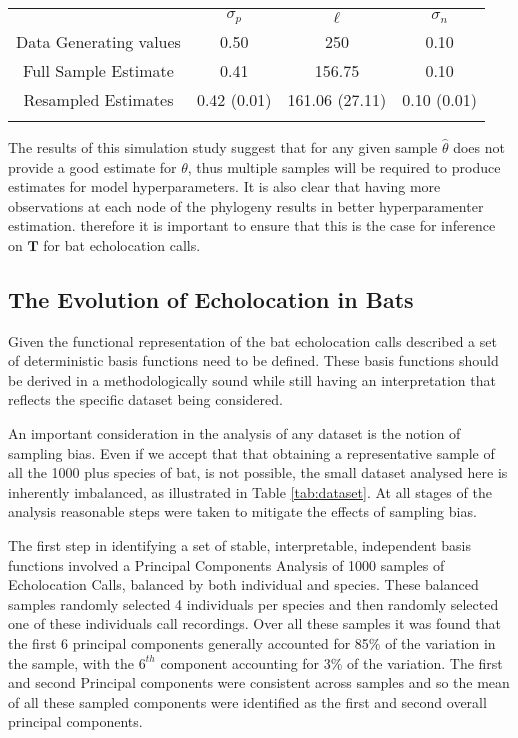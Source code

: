 \documentclass[wsdraft]{ws-rv9x6} %
\begin{document}
\begin{table}[ht]
	{
		\begin{tabular}{@{}cccc@{}} \toprule
			& \(\sigma_p \) & \(\ell\) & \(\sigma_n\) \\
			\colrule
			Data Generating values & 0.50 & 250 & 0.10 \\
			Full Sample Estimate &  0.41 & 156.75 & 0.10 \\
			Resampled Estimates & 0.42 (0.01) & 161.06 (27.11) & 0.10 (0.01) \\		
			\botrule
		\end{tabular}
	}
	\label{tab::simulation_option4}
\end{table}


The results of this simulation study suggest that for any given sample \(\hat{\theta}\) does not provide a good estimate for \(\theta\), thus multiple samples will be required to produce estimates for model hyperparameters. It is also clear that having more observations at each node of the phylogeny results in better hyperparamenter estimation. therefore it is important to ensure that this is the case for inference on \(\mathbf{T}\) for bat echolocation calls.  

\subsection{The Evolution of Echolocation in Bats}

Given the functional representation of the bat echolocation calls described a set of deterministic basis functions need to be defined. These basis functions should be derived in a methodologically sound while still having an interpretation that reflects the specific dataset being considered. 

An important consideration in the analysis of any dataset is the notion of sampling bias. Even if we accept that that obtaining a representative sample of all the 1000 plus species of bat, is not possible, the small dataset analysed here is inherently imbalanced, as illustrated in Table \ref{tab:dataset}. At all stages of the analysis reasonable steps were taken to mitigate the effects of sampling bias.

The first step in identifying a set of stable, interpretable, independent basis functions involved a Principal Components Analysis of 1000 samples of Echolocation Calls, balanced by both individual and species. These balanced samples randomly selected 4 individuals per species and then  randomly selected one of these individuals call recordings. Over all these samples it was found that the first 6 principal components generally accounted for 85\% of the variation in the sample, with the \(6^{th}\) component accounting for 3\% of the variation. The first and second Principal components were consistent across samples and so the mean of all these sampled components were identified as the first and second overall principal components. 
\end{document}
